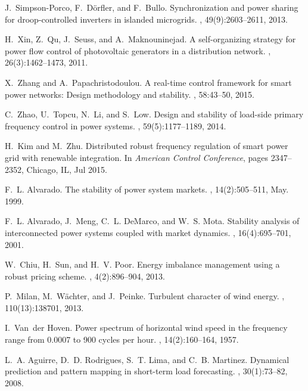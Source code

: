 \documentclass[journal]{IEEEtran}
\begin{document}
\begin{thebibliography}{10}
J.~Simpson-Porco, F.~D{\"o}rfler, and F.~Bullo.
\newblock Synchronization and power sharing for droop-controlled inverters in
  islanded microgrids.
, 49(9):2603--2611, 2013.

H.~Xin, Z.~Qu, J.~Seuss, and A.~Maknouninejad.
\newblock A self-organizing strategy for power flow control of photovoltaic
  generators in a distribution network.
, 26(3):1462--1473, 2011.

X.~Zhang and A.~Papachristodoulou.
\newblock A real-time control framework for smart power networks: Design
  methodology and stability.
, 58:43--50, 2015.

C.~Zhao, U.~Topcu, N.~Li, and S.~Low.
\newblock Design and stability of load-side primary frequency control in power
  systems.
, 59(5):1177--1189, 2014.

H.~Kim and M.~Zhu.
\newblock Distributed robust frequency regulation of smart power grid with
  renewable integration.
\newblock In {\em American Control Conference}, pages 2347--2352, Chicago, IL,
  Jul 2015.

F.~L. Alvarado.
\newblock The stability of power system markets.
, 14(2):505--511, May. 1999.

F.~L. Alvarado, J.~Meng, C.~L. DeMarco, and W.~S. Mota.
\newblock Stability analysis of interconnected power systems coupled with
  market dynamics.
, 16(4):695--701, 2001.

W.~Chiu, H.~Sun, and H.~V. Poor.
\newblock Energy imbalance management using a robust pricing scheme.
, 4(2):896--904, 2013.

P.~Milan, M.~W{\"a}chter, and J.~Peinke.
\newblock Turbulent character of wind energy.
, 110(13):138701, 2013.

I.~Van~der Hoven.
\newblock Power spectrum of horizontal wind speed in the frequency range from
  0.0007 to 900 cycles per hour.
, 14(2):160--164, 1957.

L.~A. Aguirre, D.~D. Rodrigues, S.~T. Lima, and C.~B. Martinez.
\newblock Dynamical prediction and pattern mapping in short-term load
  forecasting.
,
  30(1):73--82, 2008.


\end{thebibliography}
\end{document}
